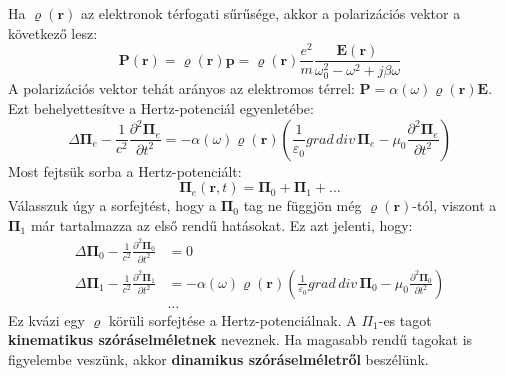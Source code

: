 \documentclass[../main.tex]{subfiles}
\begin{document}
Ha $\varrho(\mathbf{r})$ az elektronok térfogati sűrűsége, akkor a polarizációs vektor a következő lesz:
\begin{equation}
    \mathbf{P}(\mathbf{r}) = \varrho(\mathbf{r}) \mathbf{p} = \varrho(\mathbf{r}) \frac{e^2}{m} \frac{\mathbf{E}(\mathbf{r})}{\omega_0^2 - \omega^2 + j \beta \omega}
\end{equation}
A polarizációs vektor tehát arányos az elektromos térrel: $\mathbf{P} = \alpha(\omega) \varrho(\mathbf{r}) \mathbf{E}$. Ezt behelyettesítve a Hertz-potenciál egyenletébe:
\begin{equation}
    \Delta \mathbf{\Pi}_e - \frac{1}{c^2} \frac{\partial^2 \mathbf{\Pi}_e}{\partial t^2} = - \alpha(\omega) \varrho(\mathbf{r}) \left(\frac{1}{\varepsilon_0} grad \, div \, \mathbf{\Pi}_e - \mu_0 \frac{\partial^2 \mathbf{\Pi}_e}{\partial t^2}\right)
\end{equation}
Most fejtsük sorba a Hertz-potenciált:
\begin{equation}
    \mathbf{\Pi}_e(\mathbf{r}, t) = \mathbf{\Pi}_0 + \mathbf{\Pi}_1 + \ldots
\end{equation}
Válasszuk úgy a sorfejtést, hogy a $\mathbf{\Pi}_0$ tag ne függjön még $\varrho(\mathbf{r})$-tól, viszont a $\mathbf{\Pi}_1$ már tartalmazza az első rendű hatásokat. Ez azt jelenti, hogy:
\begin{equation}
    \begin{aligned}
        \Delta \mathbf{\Pi}_0 - \frac{1}{c^2} \frac{\partial^2 \mathbf{\Pi}_0}{\partial t^2} &= 0 \\
        \Delta \mathbf{\Pi}_1 - \frac{1}{c^2} \frac{\partial^2 \mathbf{\Pi}_1}{\partial t^2} &= - \alpha(\omega) \varrho(\mathbf{r}) \left(\frac{1}{\varepsilon_0} grad \, div \, \mathbf{\Pi}_0 - \mu_0 \frac{\partial^2 \mathbf{\Pi}_0}{\partial t^2}\right) \\
        &\ldots
    \end{aligned}
\end{equation}
Ez kvázi egy $\varrho$ körüli sorfejtése a Hertz-potenciálnak. A $\Pi_1$-es tagot \textbf{kinematikus szóráselméletnek} neveznek. Ha magasabb rendű tagokat is figyelembe veszünk, akkor \textbf{dinamikus szóráselméletről} beszélünk.
\end{document}
